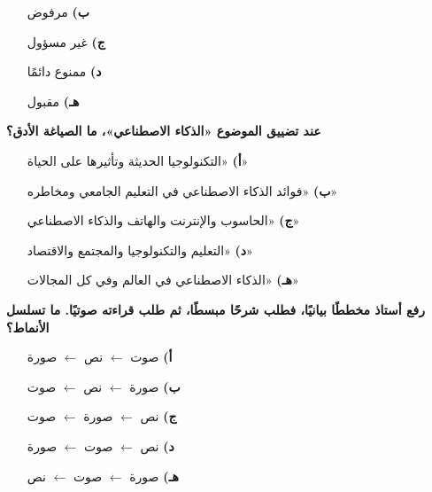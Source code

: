 \documentclass[11pt,a4paper]{article}
\begin{document}
\begin{multicols}{2}
\begin{minipage}{\linewidth}
\begin{itemize}[leftmargin=0.95cm, labelsep=4pt, itemsep=0pt, topsep=2pt, parsep=0pt]
  \item[\textbf{ب)}] مرفوض
  \item[\textbf{ج)}] غير مسؤول
  \item[\textbf{د)}] ممنوع دائمًا
  \item[\textbf{هـ)}] مقبول
\end{itemize}
\end{minipage}\par\vspace{7pt plus 4pt}
\noindent\begin{minipage}{\linewidth}
\hangindent=0.7cm\textbf{عند تضييق الموضوع «الذكاء الاصطناعي»، ما الصياغة الأدق؟}
\begin{itemize}[leftmargin=0.95cm, labelsep=4pt, itemsep=0pt, topsep=2pt, parsep=0pt]
  \item[\textbf{أ)}] «التكنولوجيا الحديثة وتأثيرها على الحياة»
  \item[\textbf{ب)}] «فوائد الذكاء الاصطناعي في التعليم الجامعي ومخاطره»
  \item[\textbf{ج)}] «الحاسوب والإنترنت والهاتف والذكاء الاصطناعي»
  \item[\textbf{د)}] «التعليم والتكنولوجيا والمجتمع والاقتصاد»
  \item[\textbf{هـ)}] «الذكاء الاصطناعي في العالم وفي كل المجالات»
\end{itemize}
\end{minipage}\par\vspace{7pt plus 4pt}
\noindent\begin{minipage}{\linewidth}
\hangindent=0.7cm\textbf{رفع أستاذ مخططًا بيانيًا، فطلب شرحًا مبسطًا، ثم طلب قراءته صوتيًا. ما تسلسل الأنماط؟}
\begin{itemize}[leftmargin=0.95cm, labelsep=4pt, itemsep=0pt, topsep=2pt, parsep=0pt]
  \item[\textbf{أ)}] صوت $\leftarrow$ نص $\leftarrow$ صورة
  \item[\textbf{ب)}] صورة $\leftarrow$ نص $\leftarrow$ صوت
  \item[\textbf{ج)}] نص $\leftarrow$ صورة $\leftarrow$ صوت
  \item[\textbf{د)}] نص $\leftarrow$ صوت $\leftarrow$ صورة
  \item[\textbf{هـ)}] صورة $\leftarrow$ صوت $\leftarrow$ نص
\end{itemize}
\end{minipage}\par\vspace{7pt plus 4pt}

\end{multicols}
\end{document}
